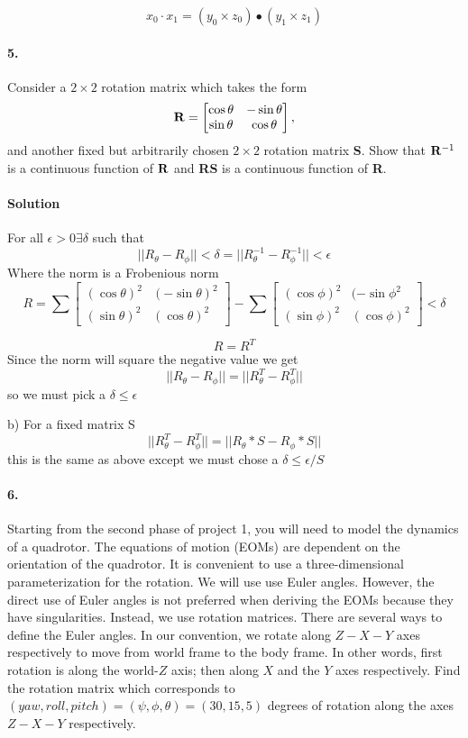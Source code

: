 \documentclass[english]{article}
\begin{document}
$$ x_0 \cdot x_1 =  (y_0 \times z_0)  \bullet (y_1 \times z_1) $$


\paragraph{5.}

Consider a $2 \times 2$ rotation matrix which takes the form
\[
{\bf R} = \begin{bmatrix} \cos \theta & -\sin \theta  \\
\sin \theta  & \cos \theta \end{bmatrix}, 
\]
and another fixed but arbitrarily chosen $2 \times 2$ rotation matrix {\bf S}. 
Show that ${\bf R}^{-1}$ is a continuous function of ${\bf R}$ and {\bf RS} is a continuous function of {\bf R}.  
\paragraph{Solution}
For all $ \epsilon  > 0 \exists \delta$ such that 
$$
|| R_{\theta}  - R_{\phi} || < \delta  = || R_{\theta}^{-1} - R_{\phi}^{-1} || < \epsilon  
$$
Where the norm is a Frobenious norm 
$$ 
 R = \sum \begin{bmatrix} (\cos \theta)^2  & (-\sin \theta )^2 \\
(\sin \theta)^2  & (\cos \theta)^2 \end{bmatrix}   -    \sum \begin{bmatrix} (\cos \phi)^2  & (-\sin \phi^2 \\
(\sin \phi)^2  & (\cos \phi)^2 \end{bmatrix}< \delta
$$

$$ 
R = R^T 
$$
Since the norm will square the negative value we get 
$$ 
||R_{\theta} - R_{\phi} ||  = ||R^T_{\theta} - R^T_{\phi}|| 
$$ 
so we must pick a $ \delta \leq \epsilon $ 

b) 
For a fixed matrix S 
$$ 
|| R^T_{\theta} - R^T_{\phi} ||  = ||R_\theta *S - R_\phi *S  || 
$$ 
this is the same as above except we must chose a  $ \delta \leq \epsilon/S $

\paragraph{6.}

Starting from the second phase of project 1, you will need to model the dynamics of a quadrotor.
The equations of motion (EOMs) are dependent on the orientation of the quadrotor.
It is convenient to use a three-dimensional parameterization for the rotation. We will use use Euler angles.
However, the direct use of Euler angles is not preferred when deriving the EOMs because they have singularities. Instead, we use rotation matrices. 
There are several ways to define the Euler angles. 
In our convention, we rotate along $Z-X-Y$ axes respectively to move from world frame to the body frame. 
In other words, first rotation is along the world-$Z$ axis; then along $X$ and the $Y$ axes respectively. 
Find the rotation matrix which corresponds to $(yaw, roll, pitch) = (\psi,\phi,\theta) = (30, 15, 5)$ degrees of rotation along the axes $Z-X-Y$ respectively.
\end{document}
